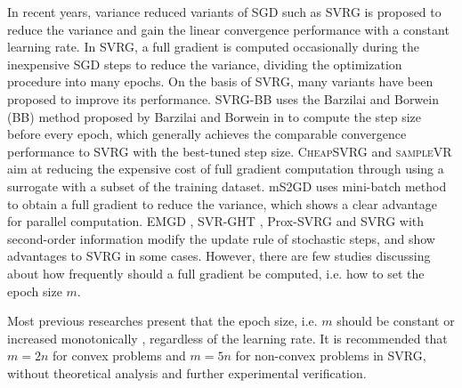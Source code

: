 \documentclass[conference]{IEEEtran}
\begin{document}
In recent years, variance reduced variants of SGD such as SVRG \citep{Johnson:9MAvkbgy}  is proposed to reduce the variance and gain the linear convergence performance with a constant learning rate. In SVRG, a full gradient is computed occasionally during the inexpensive SGD steps to reduce the variance, dividing the optimization procedure into many epochs. On the basis of SVRG, many variants have been proposed to improve its performance.
SVRG-BB \citep{Tan2016Barzilai} uses the Barzilai and Borwein (BB) method proposed by Barzilai and Borwein in \citep{Barzilai1988Two} to compute the step size before every epoch, which generally achieves the comparable convergence performance to SVRG with the best-tuned step size.
\textsc{CheapSVRG} \citep{Shah2016Trading} and \textsc{sampleVR} aim at reducing the expensive cost of full gradient computation through using a surrogate with a subset of the training dataset. 
mS2GD \citep{Liu:2015bx} uses mini-batch method to obtain a full gradient to reduce the variance, which shows a clear advantage for  parallel computation.  EMGD \citep{Zhang2013Linear}, SVR-GHT \citep{Li:2016vh}, Prox-SVRG \citep{Xiao:2014vw} and SVRG with second-order information \citep{KolteAccelerating} modify the update rule of stochastic steps, and show advantages to SVRG in some cases.  However, there are few studies discussing about how frequently should a full gradient be computed, i.e. how to set the epoch size $m$.

Most previous researches present that the epoch size, i.e. $m$ should be constant \citep{Johnson:9MAvkbgy, Tan2016Barzilai, Shah2016Trading} or increased monotonically \citep{Liu:2015bx},  regardless of the learning rate. It is recommended that $m = 2n$ for convex problems and $m = 5n$ for non-convex problems in SVRG, without theoretical analysis and further experimental verification. 
\end{document}
